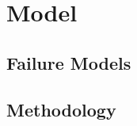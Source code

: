 
\chapter{Model}
\label{ch:Model}

\section{Failure Models}\label{section:model:failure}


\section{Methodology}
